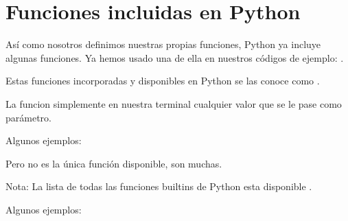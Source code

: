 \documentclass[a4paper,12pt,spanish]{sphinxmanual}
\begin{document}
\sphinxstepscope


\chapter{Funciones incluidas en Python}
\label{\detokenize{builtins:funciones-incluidas-en-python}}\label{\detokenize{builtins::doc}}
\sphinxAtStartPar
Así como nosotros definimos nuestras propias funciones, Python ya incluye
algunas funciones. Ya hemos usado una de ella en nuestros códigos de
ejemplo: .

\sphinxAtStartPar
Estas funciones incorporadas y disponibles en Python se las conoce como .

\sphinxAtStartPar
La funcion  simplemente  en nuestra terminal cualquier
valor que se le pase como parámetro.

\sphinxAtStartPar
Algunos ejemplos:

\begin{sphinxVerbatim}[commandchars=\\\{\}]
  
\end{sphinxVerbatim}

\sphinxAtStartPar
Pero  no es la única función disponible, son muchas.

\sphinxAtStartPar
Nota: La lista de todas las funciones built\sphinxhyphen{}ins de Python esta disponible
.

\sphinxAtStartPar
Algunos ejemplos:
\end{document}
